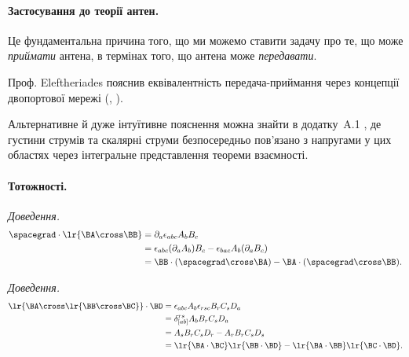 \paragraph{Застосування до теорії антен.}
Це фундаментальна причина того, що ми можемо ставити задачу про те, що може \emph{приймати} антена, в термінах того, що антена може \emph{передавати}.

Проф. Eleftheriades пояснив еквівалентність передача-приймання через концепції двопортової мережі (\citep{irwin2007bec}, \citep{sedra1982microelectronic}).

Альтернативне й дуже інтуїтивне пояснення можна знайти в додатку~A.1 \citep{chen2005reciprocity}, де густини струмів  та скалярні струми безпосередньо пов'язано з напругами у цих областях через інтегральне представлення теореми взаємності.

\paragraph{Тотожності.}

\emph{Доведення.}
\begin{equation}\label{eqn:reciprocityTheorem:420}
\begin{aligned}
\spacegrad \cdot \lr{\BA \cross \BB}
&=
\partial_a \epsilon_{a b c} A_b B_c
\\ &=
\epsilon_{a b c} (\partial_a A_b) B_c
-
\epsilon_{b a c} A_b (\partial_a B_c)
\\ &=
\BB \cdot (\spacegrad \cross \BA)
- \BA \cdot (\spacegrad \cross \BB).
\end{aligned}
\end{equation}

\emph{Доведення.}
\begin{equation}\label{eqn:reciprocityTheorem:540}
\begin{aligned}
\lr{\BA \cross \lr{\BB \cross \BC}} \cdot \BD
&=
\epsilon_{a b c} A_b \epsilon_{r s c} B_r C_s D_a
\\ &=
\delta_{[a b]}^{r s}
A_b B_r C_s D_a
\\ &=
A_s B_r C_s D_r
- A_r B_r C_s D_s
\\ &=
\lr{\BA \cdot \BC} \lr{\BB \cdot \BD}
- \lr{\BA \cdot \BB} \lr{\BC \cdot \BD}.
\end{aligned}
\end{equation}
